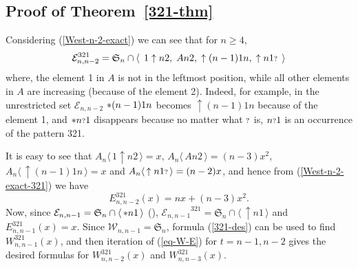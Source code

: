 \documentclass[11pt]{article}
\newcommand{\sortable}[2]{\ensuremath{\mathcal{W}_{#1,#2}}}
\newcommand{\exactly}[2]{\ensuremath{\mathcal{E}_{#1,#2}}}
\newcommand{\sym}{\mathfrak{S}}
\newcommand{\st}{\mbox{\ensuremath{\ast}}}
\newcommand{\q}{\mbox{\ensuremath{\scriptstyle{?}}}}
\newcommand{\+}{\mbox{\ensuremath{\scriptstyle{+}}}}
\newcommand{\glob}[1]{\ensuremath{\langle\, #1\,\rangle}}
\begin{document}
\subsection{Proof of Theorem~\ref{321-thm}}

Considering (\ref{West-n-2-exact}) we can see that for $n\geq 4$,
\begin{align}\label{West-n-2-exact-321}
	\exactly{n}{n-2}^{321} = \sym_n \cap
	\glob{\;1\uparrow n2,\; An2,\; \uparrow (n-1)1n,\; \uparrow n1\q\;}
\end{align}
where, the element 1 in $A$ is not in the leftmost position, while all other elements in $A$ are increasing (because of the element 2). Indeed, for example, in the unrestricted set $\exactly{n}{n-2}$ $\st(n-1)1n$ becomes $\uparrow(n-1)1n$  because of the element 1, and $\st n\q1$ disappears  because no matter what $\q$ is, $n\q1$ is an occurrence of the pattern 321.

It is easy to see that $A_n \glob{1\uparrow n2}=x$, $A_n \glob{An2}=(n-3)x^2$, $A_n \glob{\uparrow (n-1)1n}=x$ and $A_n \glob{\uparrow n1\q}=(n-2)x$, and hence from (\ref{West-n-2-exact-321}) we have
$$E^{321}_{n,n-2}(x)=nx+(n-3)x^2.$$
Now, since $\exactly{n}{n-1}=\sym_n \cap \glob{\st n1}$ (\cite{West1990Permutations}),  $\exactly{n}{n-1}^{321}=\sym_n \cap \glob{\uparrow n1}$ and $E^{321}_{n,n-1}(x)=x$. Since $\sortable{n}{n-1}=\sym_n$, formula (\ref{321-des}) can be used to find $W^{321}_{n,n-1}(x)$, and then iteration of (\ref{eq-W-E}) for $t=n-1, n-2$ gives the desired formulas for $W^{321}_{n,n-2}(x)$ and $W^{321}_{n,n-3}(x)$.
\end{document}
